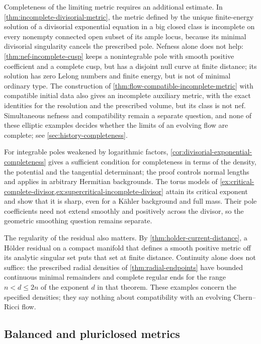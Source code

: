 Completeness of the limiting metric requires an additional estimate. In \cref{thm:incomplete-divisorial-metric}, the metric defined by the unique finite-energy solution of a divisorial exponential equation in a big closed class is incomplete on every nonempty connected open subset of its ample locus, because its minimal divisorial singularity cancels the prescribed pole. Nefness alone does not help: \cref{thm:nef-incomplete-cusp} keeps a nonintegrable pole with smooth positive coefficient and a complete cusp, but has a disjoint null curve at finite distance; its solution has zero Lelong numbers and finite energy, but is not of minimal ordinary type. The construction of \cref{thm:flow-compatible-incomplete-metric} with compatible initial data also gives an incomplete auxiliary metric, with the exact identities for the resolution and the prescribed volume, but its class is not nef. Simultaneous nefness and compatibility remain a separate question, and none of these elliptic examples decides whether the limits of an evolving flow are complete; see \cref{sec:history-completeness}.

For integrable poles weakened by logarithmic factors, \cref{cor:divisorial-exponential-completeness} gives a sufficient condition for completeness in terms of the density, the potential and the tangential determinant; the proof controls normal lengths and applies in arbitrary Hermitian backgrounds. The torus models of \cref{ex:critical-complete-divisor,ex:supercritical-incomplete-divisor} attain its critical exponent and show that it is sharp, even for a K\"ahler background and full mass. Their pole coefficients need not extend smoothly and positively across the divisor, so the geometric smoothing question remains separate.

The regularity of the residual also matters. By \cref{thm:holder-current-distance}, a H\"older residual on a compact manifold that defines a smooth positive metric off its analytic singular set puts that set at finite distance. Continuity alone does not suffice: the prescribed radial densities of \cref{thm:radial-endpoints} have bounded continuous minimal remainders and complete regular ends for the range $n<d\leq2n$ of the exponent $d$ in that theorem. These examples concern the specified densities; they say nothing about compatibility with an evolving Chern--Ricci flow.

\subsection{Balanced and pluriclosed metrics}

